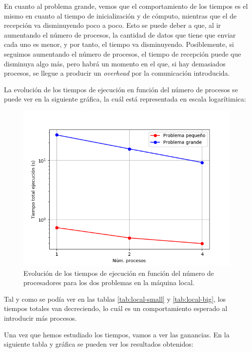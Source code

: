 \documentclass[11pt,a4paper]{article}
\begin{document}
En cuanto al problema grande, vemos que el comportamiento de los tiempos es el mismo
en cuanto al tiempo de inicialización y de cómputo, mientras que el de recepción va disminuyendo
poco a poco. Esto se puede deber a que, al ir aumentando el número de procesos, la cantidad
de datos que tiene que enviar cada uno es menor, y por tanto, el tiempo va disminuyendo.
Posiblemente, si seguimos aumentando el número de procesos, el tiempo de recepción puede
que disminuya algo más, pero habrá un momento en el que, si hay demasiados procesos, se llegue
a producir un \textit{overhead} por la comunicación introducida.

La evolución de los tiempos de ejecución en función del número de procesos se puede ver
en la siguiente gráfica, la cuál está representada en escala logarítimica:

\begin{figure}[H]
  \centering
  \includegraphics[scale=0.6]{img/local-tiempos}
  \caption{Evolución de los tiempos de ejecución en función del número de procesadores para
  los dos problemas en la máquina local.}
  \label{fig:local-tiempos}
\end{figure}

Tal y como se podía ver en las tablas \ref{tab:local-small} y \ref{tab:local-big}, los tiempos
totales van decreciendo, lo cuál es un comportamiento esperado al introducir más procesos.

Una vez que hemos estudiado los tiempos, vamos a ver las ganancias. En la siguiente tabla
y gráfica se pueden ver los resultados obtenidos:
\end{document}
